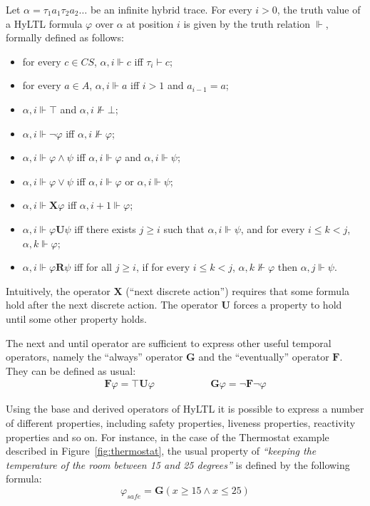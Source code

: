\documentclass[submission,copyright,creativecommons]{eptcs}
\newcommand{\hyltl}{\textsf{HyLTL}\xspace}
\newcommand{\X}{\ensuremath{\mathbin{\mathbf{X}}}\xspace}
\newcommand{\U}{\ensuremath{\mathbin{\mathbf{U}}}\xspace}
\newcommand{\R}{\ensuremath{\mathbin{\mathbf{R}}}\xspace}
\newcommand{\F}{\ensuremath{\mathbin{\mathbf{F}}}\xspace}
\newcommand{\G}{\ensuremath{\mathbin{\mathbf{G}}}\xspace}
\newcommand{\fcs}{\ensuremath{CS}\xspace}
\newcommand{\mmodels}{\Vdash}
\newcommand{\cmodels}{\vdash}
\renewcommand{\quote}[1]{\emph{``#1''}}
\begin{document}
\medskip

Let $\alpha = \tau_1 a_1 \tau_2 a_2 \ldots$ be an infinite hybrid trace. For every $i > 0$, the truth value of a \hyltl formula $\varphi$ over $\alpha$ at position $i$ is given by the truth relation $\mmodels$, formally defined as follows:

\begin{itemize}
	\item for every $c \in \fcs$, $\alpha, i \mmodels c$ iff $\tau_i \cmodels c$;
	\item for every $a \in A$, $\alpha, i \mmodels a$ iff $i > 1$ and $a_{i-1} = a$;
	\item $\alpha,i \mmodels \top$ and $\alpha,i \not\mmodels \bot$;
	\item $\alpha,i \mmodels \neg\varphi$ iff $\alpha,i\not\mmodels\varphi$;
	\item $\alpha,i \mmodels \varphi \land \psi$ iff $\alpha,i \mmodels \varphi$ and $\alpha,i \mmodels \psi$;
	\item $\alpha,i \mmodels \varphi \lor \psi$ iff $\alpha,i \mmodels \varphi$ or $\alpha,i \mmodels \psi$;
	\item $\alpha,i \mmodels \X\varphi$ iff $\alpha,i+1 \mmodels \varphi$;
	\item $\alpha,i \mmodels \varphi \U \psi$ iff there exists $j \geq i$ such that $\alpha,i\mmodels\psi$, and for every $i\leq k < j$, $\alpha,k\mmodels\varphi$;	
	\item $\alpha,i \mmodels \varphi \R \psi$ iff for all $j \geq i$, if for every $i \leq k < j$, $\alpha, k \not\mmodels \varphi$ then $\alpha,j \mmodels \psi$.
\end{itemize}

\noindent Intuitively, the operator $\X$ (``next discrete action'') requires that some formula hold after the next discrete action. The operator $\U$ forces a property to hold until some other property holds.

The next and until operator are sufficient to express other useful temporal operators, namely the ``always'' operator $\G$ and the ``eventually'' operator $\F$. They can be defined as usual:
\begin{eqnarray*}
	\F \varphi = \top \U \varphi & \qquad\qquad & \G \varphi = \neg \F \neg \varphi
\end{eqnarray*}


\noindent Using the base and derived operators of \hyltl it is possible to express a number of different properties, including safety properties, liveness properties, reactivity properties and so on. For instance, in the case of the Thermostat example described in Figure~\ref{fig:thermostat}, the usual property of \quote{keeping the temperature of the room between 15 and 25 degrees} is defined by the following formula:
\begin{equation}
	\varphi_{safe} = \G \left(x \geq 15 \land x \leq 25\right)
\end{equation}
\end{document}
